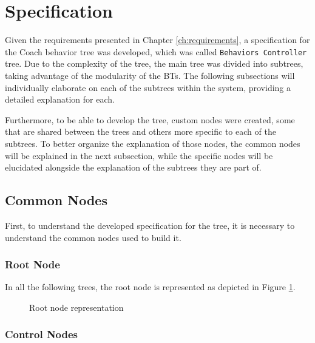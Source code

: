 \section{Specification}
\label{sec:specification}

Given the requirements presented in Chapter \ref{ch:requirements}, a specification for the Coach behavior tree was developed, which was called \texttt{Behaviors Controller} tree. Due to the complexity of the tree, the main tree was divided into subtrees, taking advantage of the modularity of the BTs. The following subsections will individually elaborate on each of the subtrees within the system, providing a detailed explanation for each. 

Furthermore, to be able to develop the tree, custom nodes were created, some that are shared between the trees and others more specific to each of the subtrees. To better organize the explanation of those nodes, the common nodes will be explained in the next subsection, while the specific nodes will be elucidated alongside the explanation of the subtrees they are part of.

\subsection{Common Nodes}
\label{subsec:common_nodes_spec}

First, to understand the developed specification for the tree, it is necessary to understand the common nodes used to build it.

\subsubsection{Root Node}

In all the following trees, the root node is represented as depicted in Figure \ref{fig:root_node_spec}.

\begin{figure}[!h]
    \centering
    \begin{forest}
    \end{forest}
    \caption{Root node representation}
    \label{fig:root_node_spec}
\end{figure}

\subsubsection{Control Nodes}
\label{subsubsec:control_nodes_spec}

